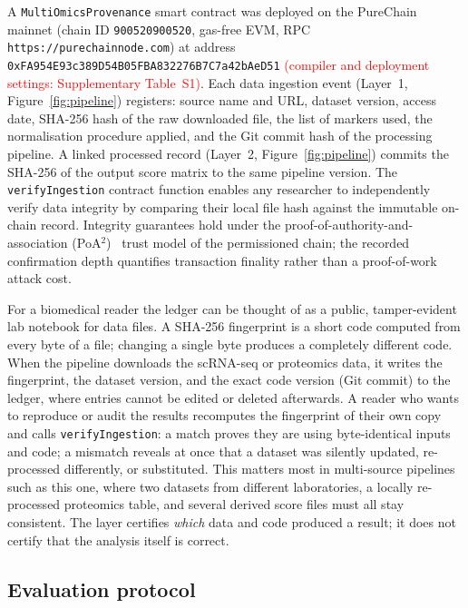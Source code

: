 \documentclass[5p,times,twocolumn]{elsarticle}
\newcommand{\rtag}[1]{}
\newcommand{\rev}[2]{\rtag{#1}\textcolor{red}{#2}}
\newenvironment{revblock}[1]{\par\color{red}\rtag{#1}\ignorespaces}{\par}
\begin{document}
A \texttt{MultiOmicsProvenance} smart contract was deployed
on the PureChain mainnet (chain ID \texttt{900520900520},
gas-free EVM, RPC \texttt{https://purechainnode.com}) at
address \texttt{0xFA954E93c389D54B05FBA832276B7C7a42bAeD51}\rev{R2.24}{
  (compiler and deployment settings: Supplementary Table~S1)}.
Each data ingestion event (Layer~1, Figure~\ref{fig:pipeline})
registers: source name and URL, dataset version, access date,
SHA-256 hash of the raw downloaded file, the list of markers
used, the normalisation procedure applied, and the Git commit
hash of the processing pipeline.
A linked processed record (Layer~2, Figure~\ref{fig:pipeline})
commits the SHA-256 of the output score matrix to the same
pipeline version.
The \texttt{verifyIngestion} contract function enables any
researcher to independently verify data integrity by
comparing their local file hash against the immutable
on-chain record.
Integrity guarantees hold under the proof-of-authority-and-association (PoA$^2$)~\cite{kanu2026offline} trust
model of the permissioned chain; the recorded confirmation
depth quantifies transaction finality rather than a
proof-of-work attack cost.

\begin{revblock}{R1.11,R2.16}
  For a biomedical reader the ledger can be thought of as a
  public, tamper-evident lab notebook for data files. A SHA-256
  fingerprint is a short code computed from every byte of a
  file; changing a single byte produces a completely different
  code. When the pipeline downloads the scRNA-seq or proteomics
  data, it writes the fingerprint, the dataset version, and the
  exact code version (Git commit) to the ledger, where entries
  cannot be edited or deleted afterwards. A reader who wants to
  reproduce or audit the results recomputes the fingerprint of
  their own copy and calls \texttt{verifyIngestion}: a match
  proves they are using byte-identical inputs and code; a
  mismatch reveals at once that a dataset was silently updated,
  re-processed differently, or substituted. This matters most in
  multi-source pipelines such as this one, where two datasets
  from different laboratories, a locally re-processed
  proteomics table, and several derived score files must all
  stay consistent. The layer certifies \textit{which} data and
  code produced a result; it does not certify that the analysis
  itself is correct.
\end{revblock}

\subsection{\textbf{Evaluation protocol}}
\label{sec:eval}
\end{document}
